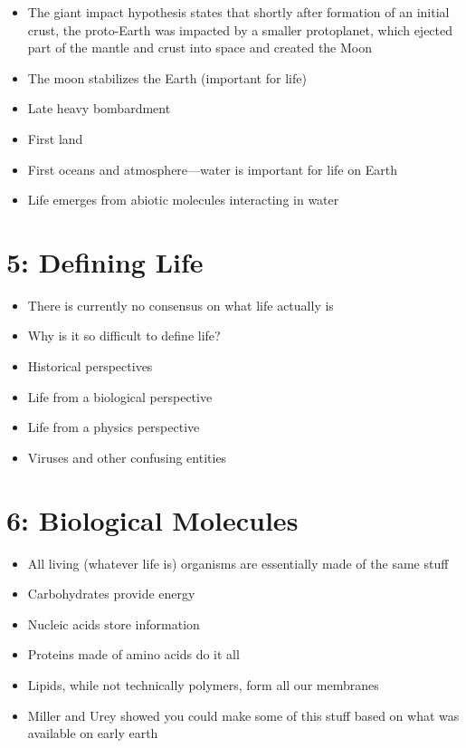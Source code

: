 \documentclass[
]{report}
\providecommand{\tightlist}{%
  \setlength{\itemsep}{0pt}\setlength{\parskip}{0pt}}
\providecommand{\tightlist}{%
  \setlength{\itemsep}{0pt}\setlength{\parskip}{0pt}}
\begin{document}
\begin{itemize}
\tightlist
\item
  The giant impact hypothesis states that shortly after formation of an initial crust, the proto-Earth was impacted by a smaller protoplanet, which ejected part of the mantle and crust into space and created the Moon
\item
  The moon stabilizes the Earth (important for life)
\item
  Late heavy bombardment
\item
  First land
\item
  First oceans and atmosphere---water is important for life on Earth
\item
  Life emerges from abiotic molecules interacting in water
\end{itemize}

\hypertarget{defining-life}{%
\section*{5: Defining Life}\label{defining-life}}

\begin{itemize}
\tightlist
\item
  There is currently no consensus on what life actually is
\item
  Why is it so difficult to define life?
\item
  Historical perspectives
\item
  Life from a biological perspective
\item
  Life from a physics perspective
\item
  Viruses and other confusing entities
\end{itemize}

\hypertarget{biological-molecules}{%
\section*{6: Biological Molecules}\label{biological-molecules}}

\begin{itemize}
\tightlist
\item
  All living (whatever life is) organisms are essentially made of the same stuff
\item
  Carbohydrates provide energy
\item
  Nucleic acids store information
\item
  Proteins made of amino acids do it all
\item
  Lipids, while not technically polymers, form all our membranes
\item
  Miller and Urey showed you could make some of this stuff based on what was available on early earth
\end{itemize}
\end{document}
